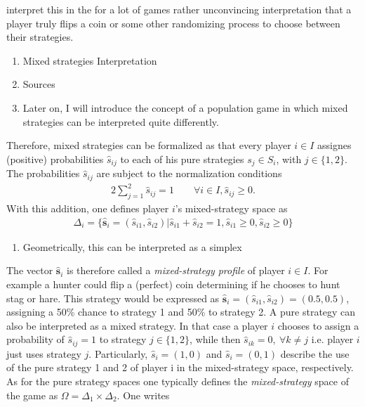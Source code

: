 \documentclass[12pt]{article}
\newcommand{\player}{I}
\newcommand{\strat}{S}
\newcommand{\stu}{s}
\newcommand{\sprob}{\hat{s}}
\newcommand{\svec}{\vec{\sprob}}
\renewcommand{\vec}{\mathbf}
\begin{document}
interpret this in the for a lot of games rather unconvincing interpretation
that a player truly flips a coin or some other randomizing process to choose
between their strategies. 
\begin{enumerate}
        \item Mixed strategies Interpretation
       \item Sources
        \item Later on, I will introduce the concept of a population game in
                which mixed strategies can be interpreted quite differently.
\end{enumerate} 
Therefore, mixed strategies can be formalized as that every player $i \in 
\player$ assignes (positive) probabilities $\sprob_{ij}$ to each of his pure
strategies $\stu_j \in \strat_i$, with $j \in \{1,2\}$. The probabilities 
$\sprob_{ij}$ are subject to the normalization conditions
\begin{alignat*}{2}
        \sum_{j=1}^{2} \sprob_{ij}= 1 \qquad \forall i \in I, \sprob_{ij} \geq 0.
        \label{norm}
\end{alignat*}
With this addition, one defines player $i$'s mixed-strategy space as 
\begin{align*}
        \Delta_i = \{\svec_i = \left(\sprob_{i1}, \sprob_{i2}\right)| \sprob_{i1} + 
        \sprob_{i2} = 1, \sprob_{i1} \geq 0, \sprob_{i2} \geq 0\}
\end{align*}
\begin{enumerate}
        \item   Geometrically, this can be interpreted as a simplex
\end{enumerate}
The vector $\svec_i$ is therefore called a \textit{mixed-strategy profile} of player
$i \in I$. For example a hunter could flip a (perfect) coin determining if 
he chooses to hunt stag or hare. This strategy would be expressed as
$\svec_i = \left( \sprob_{i1},\sprob_{i2}\right)= \left(0.5,0.5\right)$, 
assigning a 50\% chance to strategy 1 and 50\% to strategy 2. 
A pure strategy can also be interpreted as a mixed strategy. In that case a 
player $i$ chooses to assign a probability of $\sprob_{ij}=1$ to strategy
$j \in \{1,2\}$, while then $\sprob_{ik}=0, \ \forall k \neq j$ i.e. player $i$ 
just uses strategy $j$. Particularly, $\sprob_i = \left(1,0\right)$ and 
$\sprob_i = \left(0,1\right)$ describe the use of the pure strategy 1 and 2 of 
player i in the mixed-strategy space, respectively. 
As for the pure strategy spaces one typically defines the \textit{mixed-strategy}
space of the game as $\Omega = \Delta_1 \times \Delta_2$. One writes 
\end{document}

